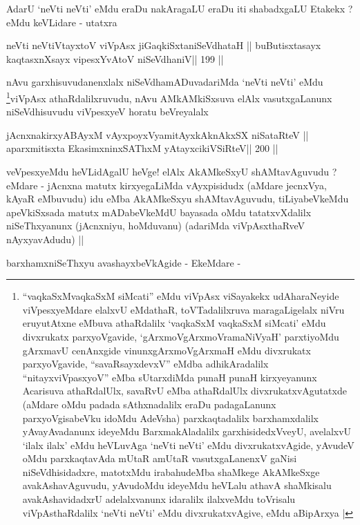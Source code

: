 \begin{artha}
AdarU `neVti neVti' eMdu eraDu nakAragaLU eraDu iti shabadxgaLU
Etakekx ? eMdu keVLidare - utatxra
\end{artha}

\begin{shl}
neVti neVtiVtayxtoV viVpAsx jiGaqkiSxtaniSeVdhataH ||
buButisxtasayx kaqtasxnXsayx vipesxYvAtoV niSeVdhaniV\hfill || 199 ||
\end{shl}

\begin{artha}
nAvu garxhisuvudanenxlalx niSeVdhamADuvadariMda `neVti neVti'
eMdu \footnote[1]{``vaqkaSxMvaqkaSxM siMcati'' eMdu viVpAsx viSayakekx
  udAharaNeyide viVpesxyeMdare elalxvU eMdathaR, toVTadalilxruva
  maragaLigelalx niVru eruyutAtxne eMbuva athaRdalilx `vaqkaSxM
  vaqkaSxM siMcati' eMdu divxrukatx parxyoVgavide,
  `gArxmoVgArxmoVramaNiVyaH' parxtiyoMdu gArxmavU cenAnxgide
  vinunxgArxmoVgArxmaH eMdu divxrukatx parxyoVgavide,
  ``savaRsayxdevxV'' eMdba adhikAradalilx ``nitayxviVpasxyoV'' eMba
  sUtarxdiMda punaH punaH kirxyeyanunx Acarisuva athaRdalUlx, savaRvU
  eMba athaRdalUlx divxrukatxvAgutatxde (aMdare oMdu padada
  sAthxnadalilx eraDu padagaLanunx parxyoVgisabeVku idoMdu AdeVsha)
  parxkaqtadalilx barxhamxdalilx yAvayAvadanunx ideyeMdu
  BarxmakAladalilx garxhisidedxVveyU, avelalxvU `ilalx ilalx' eMdu
  heVLuvAga `neVti neVti' eMdu divxrukatxvAgide, yAvudeV oMdu
  parxkaqtavAda mUtaR amUtaR vasutxgaLanenxV gaNisi niSeVdhisidadxre,
  matotxMdu irabahudeMba shaMkege AkAMkeSxge avakAshavAguvudu,
  yAvudoMdu ideyeMdu heVLalu athavA shaMkisalu avakAshavidadxrU
  adelalxvanunx idaralilx ilalxveMdu toVrisalu viVpAsthaRdalilx `neVti
  neVti' eMdu divxrukatxvAgive, eMdu aBipArxya |}viVpAsx athaRdalilxruvudu, nAvu AMkAMkiSxsuva elAlx
vasutxgaLanunx niSeVdhisuvudu viVpesxyeV horatu beVreyalalx
\end{artha}

\begin{shl}
jAcnxnakirxyABAyxM vAyxpoyxV\s yamitAyxkAknAkxSX niSataRteV ||
aparxmitisxta EkasimxninxSAThxM yAtayxcikiVSiRteV\hfill || 200 ||
\end{shl}

\begin{artha}
veVpesxyeMdu heVLidAgalU heVge! elAlx AkAMkeSxyU shAMtavAguvudu ?
eMdare - jAcnxna matutx kirxyegaLiMda vAyxpisidudx (aMdare jecnxVya,
kAyaR eMbuvudu) idu eMba AkAMkeSxyu shAMtavAguvudu, tiLiyabeVkeMdu
apeVkiSxsada matutx mADabeVkeMdU bayasada oMdu tatatxvXdalilx
niSeThxyanunx (jAcnxniyu, hoMduvanu) (adariMda viVpAsxthaRveV
nAyxyavAdudu) ||

barxhamxniSeThxyu avashayxbeVkAgide - EkeMdare -
\end{artha}

